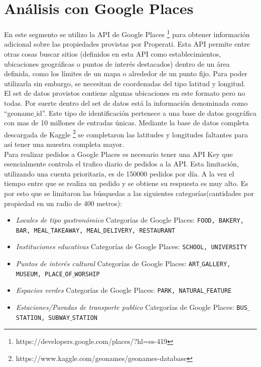 \documentclass[a4paper, 10pt]{article}
\def\code#1{\texttt{#1}}
\begin{document}
	
	\part{Análisis con Google Places}
		En este segmento se utilizo la API de Google Places 
		\footnote{https://developers.google.com/places/?hl=es-419} para obtener información adicional 
		sobre las propiedades provistas por Properati. Esta API permite entre otras cosas buscar 
		sitios (definidos en esta API como establecimientos, ubicaciones geográficas o puntos de 
		interés destacados) dentro de un área definida, como los límites de un mapa o alrededor de 
		un punto fijo. Para poder utilizarla sin embargo, se necesitan de coordenadas del tipo 
		latitud y longitud.\\ 
		El set de datos provistos contiene algunas ubicaciones en este formato pero no todas. 
		Por suerte dentro del set de datos está la información denominada como “geoname$\_$id”. 
		Este tipo de identificación pertenece a una base de datos geográfica con mas de 10 
		millones de entradas únicas. 
		Mediante la base de datos completa descargada de Kaggle
		\footnote{https://www.kaggle.com/geonames/geonames-database} se completaron las 
		latitudes y longitudes faltantes para así tener una muestra completa mayor.\\
		Para realizar pedidos a Google Places es necesario tener una API Key que esencialmente 
		controla el trafico diario de pedidos a la API. Esta limitación, utilizando una cuenta 
		prioritaria, es de 150000 pedidos por día. A la vez el tiempo entre que se realiza un 
		pedido y se obtiene su respuesta es muy alto. Es por esto que se limitaron las búsquedas 
		a las siguientes categorías(cantidades por propiedad en un radio de 400 metros):
		
		\begin{itemize}
		\item \emph{Locales de tipo gastronómico}
			\subitem Categorías de Google Places: \code{FOOD, BAKERY, BAR, MEAL$\_$TAKEAWAY, MEAL$\_$DELIVERY, RESTAURANT}
		\item \emph{Instituciones educativas}
			\subitem Categorías de Google Places: \code{SCHOOL, UNIVERSITY}
		\item \emph{Puntos de interés cultural} 
			\subitem Categorías de Google Places: \code{ART$\_$GALLERY, MUSEUM, PLACE$\_$OF$\_$WORSHIP}
		\item \emph{Espacios verdes} 
			\subitem Categorías de Google Places: \code{PARK, NATURAL$\_$FEATURE}
		\item \emph{Estaciones/Paradas de transporte publico}
			\subitem Categorías de Google Places: \code{BUS$\_$STATION, SUBWAY$\_$STATION}			
		\end{itemize}
		
\end{document}
